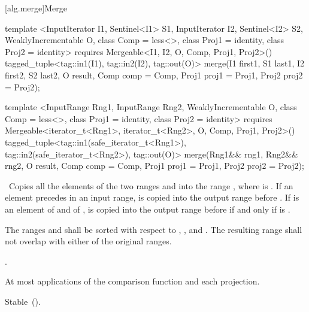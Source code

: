 [alg.merge]{Merge}

%
\begin{itemdecl}
template <InputIterator I1, Sentinel<I1> S1, InputIterator I2, Sentinel<I2> S2,
    WeaklyIncrementable O, class Comp = less<>, class Proj1 = identity,
    class Proj2 = identity>
  requires Mergeable<I1, I2, O, Comp, Proj1, Proj2>()
  tagged_tuple<tag::in1(I1), tag::in2(I2), tag::out(O)>
    merge(I1 first1, S1 last1, I2 first2, S2 last2, O result,
          Comp comp = Comp{}, Proj1 proj1 = Proj1{}, Proj2 proj2 = Proj2{});

template <InputRange Rng1, InputRange Rng2, WeaklyIncrementable O, class Comp = less<>,
    class Proj1 = identity, class Proj2 = identity>
  requires Mergeable<iterator_t<Rng1>, iterator_t<Rng2>, O, Comp, Proj1, Proj2>()
  tagged_tuple<tag::in1(safe_iterator_t<Rng1>),
               tag::in2(safe_iterator_t<Rng2>),
               tag::out(O)>
    merge(Rng1&& rng1, Rng2&& rng2, O result,
          Comp comp = Comp{}, Proj1 proj1 = Proj1{}, Proj2 proj2 = Proj2{});
\end{itemdecl}

\begin{itemdescr}
\pnum
\effects\ Copies all the elements of the two ranges  and
 into the range , where 
is .
If an element  precedes  in an input range,
 is copied into the output range before . If  is
an element of  and  of ,
 is copied into the output range before  if and only if
 is
.

\pnum
\requires The ranges  and  shall be
sorted with respect to , , and .
The resulting range shall not overlap with either of the original ranges.

\pnum
\returns
{}.

\pnum
\complexity
At most
applications of the comparison function and each projection.

\pnum
\remarks Stable~().
\end{itemdescr}

